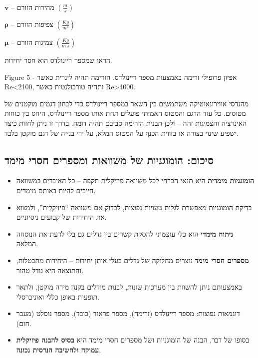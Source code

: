 \documentclass[
  hebrew,
  letterpaper,
  DIV=11,
  numbers=noendperiod]{scrreprt}
\providecommand{\tightlist}{%
  \setlength{\itemsep}{0pt}\setlength{\parskip}{0pt}}
\begin{document}
\(\mathbf{v}\) {-- מהירות הזורם} \(\left( \frac{m}{s} \right)\)

\(\mathbf{\rho}\) {-- צפיפות הזורם} \(\left( \frac{Kg}{m^{3}} \right)\)

\(\mathbf{\mu}\) {-- צמיגות הזורם} \(\left( \frac{Kg}{m\ s} \right)\)

{הראו שמספר ריינולדס הוא חסר יחידות.}

Figure {5 - אפיון פרופילי זרימה באמצעות מספר ריינולדס. הזרימה תהיה
לינרית כאשר} Re\textless2100{, ותהיה טורבולנטית כאשר}
Re\textgreater4000{.}

{מהנדסי אווירונאוטיקה משתמשים בין השאר במספר ריינולדס כדי לבחון דגמים
מוקטנים של מטוסים. כל עוד הדגם והמטוס האמיתי פועלים תחת אותו מספר
ריינולדס}, {היחס בין כוחות האינרציה והצמיגות זהה -- ולכן תבנית הזרימה
סביבם תהיה דומה. בדרך זו ניתן לחזות כיצד ישפיע שינוי בצורה או בזווית
הכנף על המטוס המלא, על ידי בנייה של דגם מוקטן בלבד.}

\subsection{\texorpdfstring{{סיכום: הומוגניות של משוואות ומספרים חסרי
מימד}}{סיכום: הומוגניות של משוואות ומספרים חסרי מימד}}\label{ux5e1ux5d9ux5dbux5d5ux5dd-ux5d4ux5d5ux5deux5d5ux5d2ux5e0ux5d9ux5d5ux5ea-ux5e9ux5dc-ux5deux5e9ux5d5ux5d5ux5d0ux5d5ux5ea-ux5d5ux5deux5e1ux5e4ux5e8ux5d9ux5dd-ux5d7ux5e1ux5e8ux5d9-ux5deux5d9ux5deux5d3}

\begin{itemize}
\tightlist
\item
  {\textbf{הומוגניות מימדית} היא תנאי הכרחי לכל משוואה פיזיקלית תקפה --
  כל האיברים במשוואה חייבים להיות באותם מימדים}.
\item
  {בדיקת הומוגניות מאפשרת לגלות טעויות נפוצות, לבדוק אם משוואה
  ``פיזיקלית'', ולמצוא את היחידות של קבועים ניסיוניים}.
\item
  {\textbf{ניתוח מימדי} הוא כלי עוצמתי להסקת קשרים בין גדלים גם בלי לדעת
  את הנוסחה המלאה}.
\item
  {\textbf{מספרים חסרי מימד} נוצרים מחלוקה של גדלים בעלי אותן יחידות --
  היחידות מתבטלות, והתוצאה היא גודל טהור}.
\item
  {באמצעותם ניתן להשוות בין מערכות שונות, לבנות מודלים בקנה מידה מוקטן,
  ולתאר תופעות באופן כללי ואוניברסלי}.
\item
  {דוגמאות נפוצות: מספר ריינולדס (זרימה), מספר פראוד (כובד), מספר נוסלט
  (מעבר חום)}.
\item
  {בסופו של דבר, הבנה של הומוגניות ושל מספרים חסרי מימד היא \textbf{בסיס
  להבנה פיזיקלית עמוקה ולחשיבה הנדסית נכונה}}.
\end{itemize}
\end{document}

